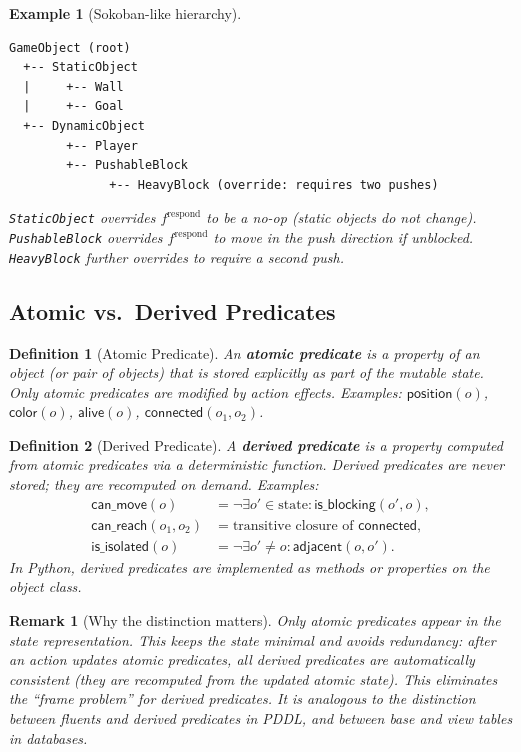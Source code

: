 \documentclass{article}
\newtheorem{definition}{Definition}
\newtheorem{remark}{Remark}
\newtheorem{example}{Example}
\begin{document}
\begin{example}[Sokoban-like hierarchy]
\label{ex:hierarchy}
\begin{verbatim}
GameObject (root)
  +-- StaticObject
  |     +-- Wall
  |     +-- Goal
  +-- DynamicObject
        +-- Player
        +-- PushableBlock
              +-- HeavyBlock (override: requires two pushes)
\end{verbatim}
\texttt{StaticObject} overrides $f^{\text{respond}}$ to be a no-op (static
objects do not change).  \texttt{PushableBlock} overrides
$f^{\text{respond}}$ to move in the push direction if unblocked.
\texttt{HeavyBlock} further overrides to require a second push.
\end{example}

\subsection{Atomic vs.\ Derived Predicates}
\label{sec:atomic_derived}

\begin{definition}[Atomic Predicate]
\label{def:atomic}
An \textbf{atomic predicate} is a property of an object (or pair of objects)
that is stored explicitly as part of the mutable state.  Only atomic predicates
are modified by action effects.  Examples: $\mathsf{position}(o)$,
$\mathsf{color}(o)$, $\mathsf{alive}(o)$, $\mathsf{connected}(o_1, o_2)$.
\end{definition}

\begin{definition}[Derived Predicate]
\label{def:derived}
A \textbf{derived predicate} is a property computed from atomic predicates
via a deterministic function.  Derived predicates are never stored; they are
recomputed on demand.  Examples:
\begin{align}
\mathsf{can\_move}(o) &= \neg \exists o' \in \text{state} :
    \mathsf{is\_blocking}(o', o), \\
\mathsf{can\_reach}(o_1, o_2) &= \text{transitive closure of }
    \mathsf{connected}, \\
\mathsf{is\_isolated}(o) &= \neg \exists o' \neq o :
    \mathsf{adjacent}(o, o').
\end{align}
In Python, derived predicates are implemented as methods or properties on the
object class.
\end{definition}

\begin{remark}[Why the distinction matters]
\label{rem:atomic_derived}
Only atomic predicates appear in the state representation.  This keeps the
state minimal and avoids redundancy: after an action updates atomic predicates,
all derived predicates are automatically consistent (they are recomputed from
the updated atomic state).  This eliminates the ``frame problem'' for derived
predicates.  It is analogous to the distinction between fluents and derived
predicates in PDDL, and between base and view tables in databases.
\end{remark}
\end{document}

